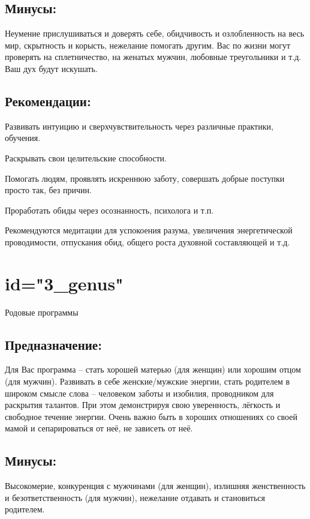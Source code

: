 \subsection{Минусы:}
Неумение прислушиваться и доверять себе, обидчивость и озлобленность 
на весь мир, скрытность и корысть, нежелание помогать другим.
Вас по жизни могут проверять на сплетничество, на женатых мужчин, 
любовные треугольники и т.д. Ваш дух будут искушать.
\endsubsection

\subsection{Рекомендации:}
\item Развивать интуицию и сверхчувствительность через различные 
практики, обучения.
\item Раскрывать свои целительские способности.
\item Помогать людям, проявлять искреннюю заботу, совершать добрые 
поступки просто так, без причин.
\item Проработать обиды через осознанность, психолога и т.п.
\item Рекомендуются медитации для успокоения разума, увеличения 
энергетической проводимости, отпускания обид, общего роста 
духовной составляющей и т.д.
\endsubsection

\endsection

\section{id="3_genus"}{Родовые программы}

\subsection{Предназначение:}
Для Вас программа – стать хорошей матерью (для женщин) или хорошим 
отцом (для мужчин). Развивать в себе женские/мужские энергии, стать 
родителем в широком смысле слова – человеком заботы и изобилия, 
проводником для раскрытия талантов. При этом демонстрируя свою 
уверенность, лёгкость и свободное течение энергии. Очень важно 
быть в хороших отношениях со своей мамой и сепарироваться от неё, 
не зависеть от неё.
\endsubsection

\subsection{Минусы:}
Высокомерие, конкуренция с мужчинами (для женщин), излишняя 
женственность и безответственность (для мужчин), нежелание 
отдавать и становиться родителем.
\endsubsection

